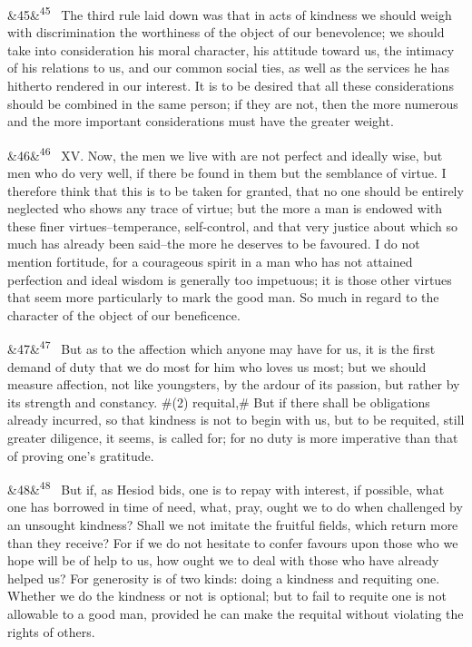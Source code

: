 \documentclass[12pt]{article}
\newcommand{\para}[1][]{\par\noindent\ifx&#1&\else\textsuperscript{\footnotesize #1}~\fi}
\begin{document}
\para[45] The third rule laid down was that in acts of kindness we should weigh with discrimination the worthiness of the object of our benevolence; we should take into consideration his moral character, his attitude toward us, the intimacy of his relations to us, and our common social ties, as well as the services he has hitherto rendered in our interest. It is to be desired that all these considerations should be combined in the same person; if they are not, then the more numerous and the more important considerations must have the greater weight.

\para[46] XV. Now, the men we live with are not perfect and ideally wise, but men who do very well, if there be found in them but the semblance of virtue. I therefore think that this is to be taken for granted, that no one should be entirely neglected who shows any trace of virtue; but the more a man is endowed with these finer virtues--temperance, self-control, and that very justice about which so much has already been said--the more he deserves to be favoured. I do not mention fortitude, for a courageous spirit in a man who has not attained perfection and ideal wisdom is generally too impetuous; it is those other virtues that seem more particularly to mark the good man. So much in regard to the character of the object of our beneficence.

\para[47] But as to the affection which anyone may have for us, it is the first demand of duty that we do most for him who loves us most; but we should measure affection, not like youngsters, by the ardour of its passion, but rather by its strength and constancy. \#(2) requital,\# But if there shall be obligations already incurred, so that kindness is not to begin with us, but to be requited, still greater diligence, it seems, is called for; for no duty is more imperative than that of proving one's gratitude.

\para[48] But if, as Hesiod bids, one is to repay with interest, if possible, what one has borrowed in time of need, what, pray, ought we to do when challenged by an unsought kindness? Shall we not imitate the fruitful fields, which return more than they receive? For if we do not hesitate to confer favours upon those who we hope will be of help to us, how ought we to deal with those who have already helped us? For generosity is of two kinds: doing a kindness and requiting one. Whether we do the kindness or not is optional; but to fail to requite one is not allowable to a good man, provided he can make the requital without violating the rights of others.
\end{document}
